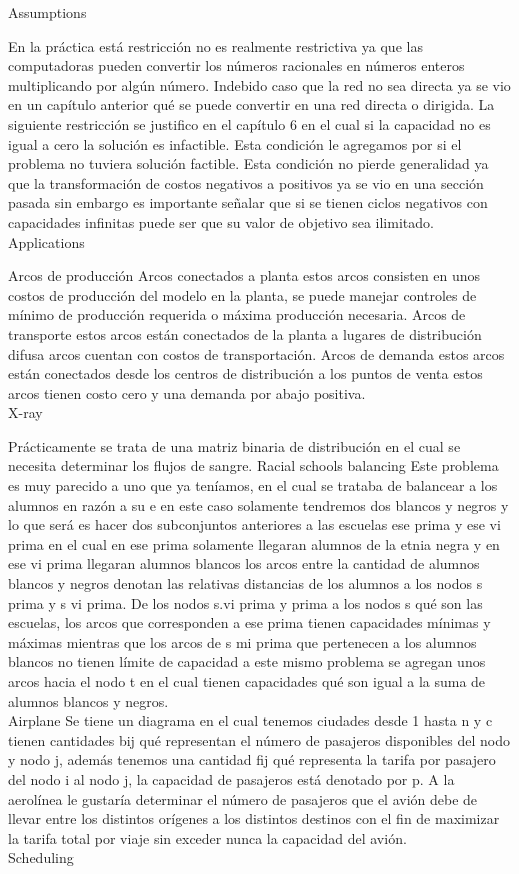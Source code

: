 \documentclass[12 pt]{report}
\begin{document}
\large
Assumptions

En la práctica está restricción no es realmente restrictiva ya que las computadoras pueden convertir los números racionales en números enteros multiplicando por algún número.
Indebido caso que la red no sea directa ya se vio en un capítulo anterior qué se puede convertir en una red directa o dirigida.
La siguiente restricción se justifico en el capítulo 6 en el cual si la capacidad no es igual a cero la solución es infactible.
Esta condición le agregamos por si el problema no tuviera solución factible.
Esta condición no pierde generalidad ya que la transformación de costos negativos a positivos ya se vio en una sección pasada sin embargo es importante señalar que si se tienen ciclos negativos con capacidades infinitas puede ser que su valor de objetivo sea ilimitado.
\\
Applications

Arcos de producción
Arcos conectados a planta estos arcos consisten en unos costos de producción del modelo en la planta, se puede manejar controles de mínimo de producción requerida o máxima producción necesaria.
Arcos de transporte estos arcos están conectados de la planta a lugares de distribución difusa arcos cuentan con costos de transportación.
Arcos de demanda estos arcos están conectados desde  los centros de distribución a los puntos de venta estos arcos tienen costo cero y una demanda por abajo positiva.
\\
X-ray

Prácticamente se trata de una matriz binaria de distribución en el cual se necesita determinar los flujos de sangre.
Racial schools balancing
Este problema es muy parecido a uno que ya teníamos, en el cual se trataba de balancear a los alumnos en razón a su e en este caso solamente tendremos dos blancos y negros y lo que será es hacer dos subconjuntos anteriores a las escuelas ese prima y ese vi prima en el cual en ese prima solamente llegaran alumnos de la etnia negra y en ese vi prima llegaran alumnos blancos los arcos entre la cantidad de alumnos blancos y negros denotan las relativas distancias de los alumnos a los nodos s prima y s vi prima. De los nodos s.vi prima y prima a los nodos s qué son las escuelas, los arcos que corresponden a ese prima tienen capacidades mínimas y máximas mientras que los arcos de s mi prima que pertenecen a los alumnos blancos no tienen límite de capacidad a este mismo problema se agregan unos arcos hacia el nodo t en el cual tienen capacidades qué son igual a la suma de alumnos blancos y negros.
\\
Airplane
Se tiene un diagrama en el cual tenemos ciudades desde 1 hasta n y c tienen cantidades bij qué representan el número de pasajeros disponibles del nodo y nodo j, además tenemos una cantidad fij qué representa la tarifa por pasajero del nodo i al nodo j, la capacidad de pasajeros está denotado por p.
A la aerolínea le gustaría determinar el número de pasajeros que el avión debe de llevar entre los distintos orígenes a los distintos destinos con el fin de maximizar la tarifa total por viaje sin exceder nunca la capacidad del avión.
\\
Scheduling
\end{document}
